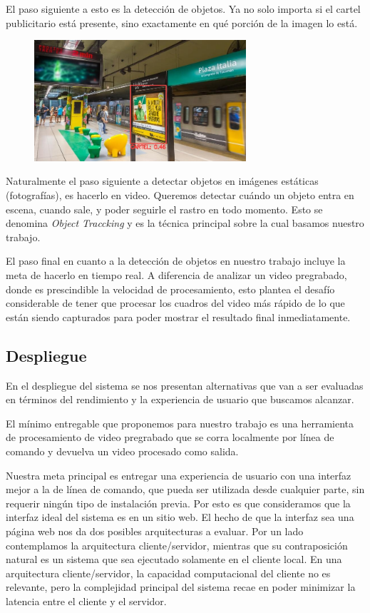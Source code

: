 \documentclass[a4paper]{article}
\begin{document}
El paso siguiente a esto es la detección de objetos. Ya no solo importa si el cartel publicitario está presente, sino exactamente en qué porción de la imagen lo está.

\begin{figure}[H]
    \includegraphics[width=0.7\textwidth]{./img/detection.jpg}
    \centering
\end{figure}

Naturalmente el paso siguiente a detectar objetos en imágenes estáticas (fotografías), es hacerlo en video. Queremos detectar cuándo un objeto entra en escena, cuando sale, y poder seguirle el rastro en todo momento. Esto se denomina \emph{Object Traccking} y es la técnica principal sobre la cual basamos nuestro trabajo.

El paso final en cuanto a la detección de objetos en nuestro trabajo incluye la meta de hacerlo en tiempo real. A diferencia de analizar un video pregrabado, donde es prescindible la velocidad de procesamiento, esto plantea el desafío considerable de tener que procesar los cuadros del video más rápido de lo que están siendo capturados para poder mostrar el resultado final inmediatamente.

\subsection{Despliegue}
En el despliegue del sistema se nos presentan alternativas que van a ser evaluadas en términos del rendimiento y la experiencia de usuario que buscamos alcanzar.

El mínimo entregable que proponemos para nuestro trabajo es una herramienta de procesamiento de video pregrabado que se corra localmente por línea de comando y devuelva un video procesado como salida.

Nuestra meta principal es entregar una experiencia de usuario con una interfaz mejor a la de línea de comando, que pueda ser utilizada desde cualquier parte, sin requerir ningún tipo de instalación previa. Por esto es que consideramos que la interfaz ideal del sistema es en un sitio web.
El hecho de que la interfaz sea una página web nos da dos posibles arquitecturas a evaluar. Por un lado contemplamos la arquitectura cliente/servidor, mientras que su contraposición natural es un sistema que sea ejecutado solamente en el cliente local.
En una arquitectura cliente/servidor, la capacidad computacional del cliente no es relevante, pero la complejidad principal del sistema recae en poder minimizar la latencia entre el cliente y el servidor.
\end{document}

